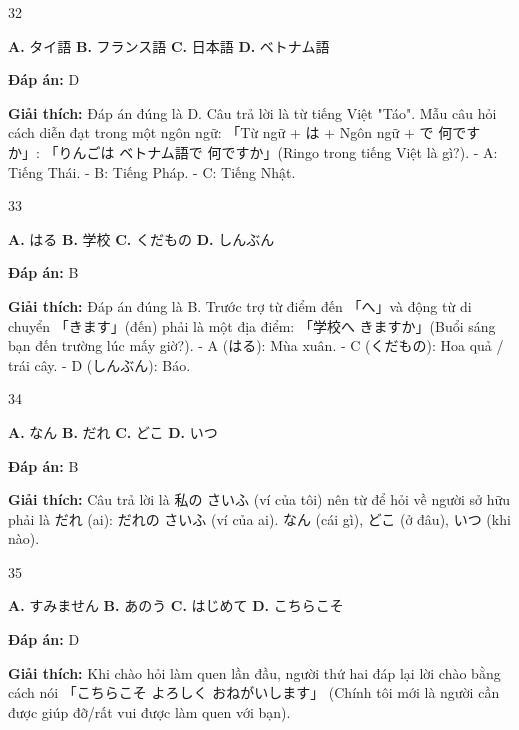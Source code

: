 \documentclass[12pt,a4paper]{report}
\newcommand{\source}[1]{}
\newcommand{\choice}[2]{\textbf{#1.} #2 \quad}
\newcommand{\answer}[1]{\par\textbf{Đáp án:} #1}
\newcommand{\confidence}[1]{}
\newcommand{\explain}[1]{\par\textbf{Giải thích:} #1\vspace{0.5cm}}
\begin{document}
\begin{question}{32}
\source{Q28.jpg}
\choice{A}{タイ語}
\choice{B}{フランス語}
\choice{C}{日本語}
\choice{D}{ベトナム語}
\answer{D}
\confidence{high}
\explain{Đáp án đúng là D. Câu trả lời là từ tiếng Việt "Táo". Mẫu câu hỏi cách diễn đạt trong một ngôn ngữ: 「Từ ngữ + は + Ngôn ngữ + で 何ですか」: 「りんごは ベトナム語で 何ですか」(Ringo trong tiếng Việt là gì?).
- A: Tiếng Thái.
- B: Tiếng Pháp.
- C: Tiếng Nhật.}
\end{question}

\begin{question}{33}
\source{Q30.jpg}
\choice{A}{はる}
\choice{B}{学校}
\choice{C}{くだもの}
\choice{D}{しんぶん}
\answer{B}
\confidence{high}
\explain{Đáp án đúng là B. Trước trợ từ điểm đến 「へ」và động từ di chuyển 「きます」(đến) phải là một địa điểm: 「学校へ きますか」(Buổi sáng bạn đến trường lúc mấy giờ?).
- A (はる): Mùa xuân.
- C (くだもの): Hoa quả / trái cây.
- D (しんぶん): Báo.}
\end{question}

\begin{question}{34}
\source{Q12.jpg}
\choice{A}{なん}
\choice{B}{だれ}
\choice{C}{どこ}
\choice{D}{いつ}
\answer{B}
\confidence{high}
\explain{Câu trả lời là 私の さいふ (ví của tôi) nên từ để hỏi về người sở hữu phải là だれ (ai): だれの さいふ (ví của ai). なん (cái gì), どこ (ở đâu), いつ (khi nào).}
\end{question}

\begin{question}{35}
\source{Q13.jpg}
\choice{A}{すみません}
\choice{B}{あのう}
\choice{C}{はじめて}
\choice{D}{こちらこそ}
\answer{D}
\confidence{high}
\explain{Khi chào hỏi làm quen lần đầu, người thứ hai đáp lại lời chào bằng cách nói 「こちらこそ よろしく おねがいします」 (Chính tôi mới là người cần được giúp đỡ/rất vui được làm quen với bạn).}
\end{question}
\end{document}
